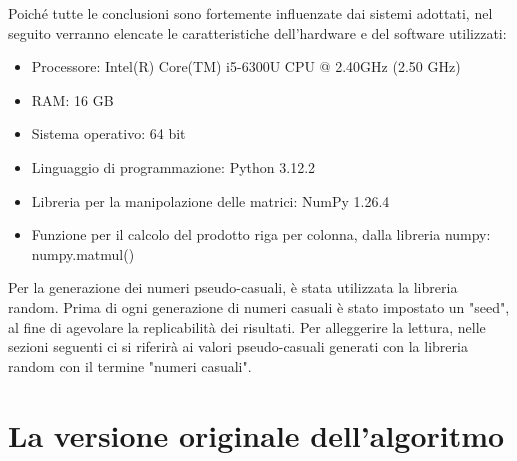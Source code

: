 \documentclass[10pt,a4paper,twoside]{tau-book}
\begin{document}
Poiché tutte le conclusioni sono fortemente influenzate dai sistemi adottati, nel seguito verranno elencate le caratteristiche dell'hardware e del software utilizzati:
\begin{itemize}
    \item  Processore: Intel(R) Core(TM) i5-6300U CPU @ 2.40GHz (2.50 GHz)
    \item RAM: 16 GB
    \item Sistema operativo: 64 bit
    \item Linguaggio di programmazione: Python 3.12.2
    \item Libreria per la manipolazione delle matrici: NumPy 1.26.4
    \item Funzione per il calcolo del prodotto riga per colonna, dalla libreria numpy: numpy.matmul()
\end{itemize}

Per la generazione dei numeri pseudo-casuali, è stata utilizzata la libreria random. Prima di ogni generazione di numeri casuali è stato impostato un "seed", al fine di agevolare la replicabilità dei risultati. Per alleggerire la lettura, nelle sezioni seguenti ci si riferirà ai valori pseudo-casuali generati con la libreria random con il termine "numeri casuali".


\section{La versione originale dell'algoritmo}
\end{document}
